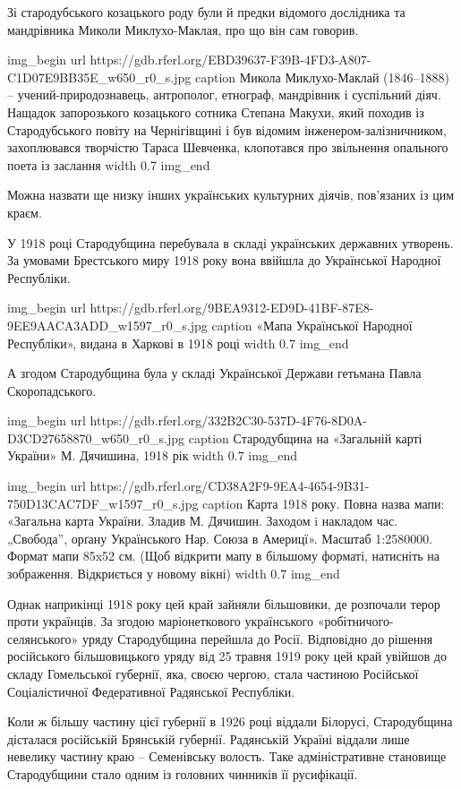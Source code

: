 Зі стародубського козацького роду були й предки відомого дослідника та
мандрівника Миколи Миклухо-Маклая, про що він сам говорив.

\ifcmt
img_begin 
  url https://gdb.rferl.org/EBD39637-F39B-4FD3-A807-C1D07E9BB35E_w650_r0_s.jpg
  caption Микола Миклухо-Маклай (1846–1888) – учений-природознавець,
  антрополог, етнограф, мандрівник і суспільний діяч. Нащадок запорозького
  козацького сотника Степана Макухи, який походив із Стародубського повіту на
  Чернігівщині і був відомим інженером-залізничником, захоплювався творчістю
  Тараса Шевченка, клопотався про звільнення опального поета із заслання
  width 0.7
img_end
\fi

Можна назвати ще низку інших українських культурних діячів, пов’язаних із цим
краєм.

У 1918 році Стародубщина перебувала в складі українських державних утворень. За
умовами Брестського миру 1918 року вона ввійшла до Української Народної
Республіки.

\ifcmt
img_begin 
  url https://gdb.rferl.org/9BEA9312-ED9D-41BF-87E8-9EE9AACA3ADD_w1597_r0_s.jpg
  caption «Мапа Української Народної Республіки», видана в Харкові в 1918 році
  width 0.7
img_end
\fi

А згодом Стародубщина була у складі Української Держави гетьмана Павла Скоропадського.

\ifcmt
img_begin 
  url https://gdb.rferl.org/332B2C30-537D-4F76-8D0A-D3CD27658870_w650_r0_s.jpg
  caption Стародубщина на «Загальній карті України» М. Дячишина, 1918 рік
  width 0.7
img_end
\fi

\ifcmt
img_begin 
  url https://gdb.rferl.org/CD38A2F9-9EA4-4654-9B31-750D13CAC7DF_w1597_r0_s.jpg
  caption Карта 1918 року. Повна назва мапи: «Загальна карта України. Зладив М.
  Дячишин. Заходом i накладом час. „Свобода”, орґану Українського Нар. Союза в
  Америцї». Масштаб 1:2580000. Формат мапи 85x52 см. (Щоб відкрити мапу в
  більшому форматі, натисніть на зображення. Відкриється у новому вікні)
  width 0.7
img_end
\fi

Однак наприкінці 1918 року цей край зайняли більшовики, де розпочали терор
проти українців. За згодою маріонеткового українського
«робітничого-селянського» уряду Стародубщина перейшла до Росії. Відповідно до
рішення російського більшовицького уряду від 25 травня 1919 року цей край
увійшов до складу Гомельської губернії, яка, своєю чергою, стала частиною
Російської Соціалістичної Федеративної Радянської Республіки.

Коли ж більшу частину цієї губернії в 1926 році віддали Білорусі, Стародубщина
дісталася російській Брянській губернії. Радянській Україні віддали лише
невелику частину краю – Семенівську волость. Таке адміністративне становище
Стародубщини стало одним із головних чинників її русифікації.


